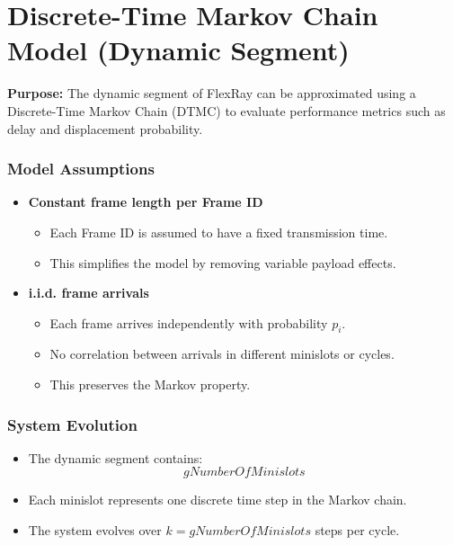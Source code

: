 \section*{Discrete-Time Markov Chain Model (Dynamic Segment)}

\textbf{Purpose:}
The dynamic segment of FlexRay can be approximated using a Discrete-Time Markov Chain (DTMC) to evaluate performance metrics such as delay and displacement probability.

\subsubsection*{Model Assumptions}

\begin{itemize}
    \item \textbf{Constant frame length per Frame ID}
    \begin{itemize}
        \item Each Frame ID is assumed to have a fixed transmission time.
        \item This simplifies the model by removing variable payload effects.
    \end{itemize}
    
    \item \textbf{i.i.d. frame arrivals}
    \begin{itemize}
        \item Each frame arrives independently with probability $p_i$.
        \item No correlation between arrivals in different minislots or cycles.
        \item This preserves the Markov property.
    \end{itemize}
\end{itemize}

\subsubsection*{System Evolution}

\begin{itemize}
    \item The dynamic segment contains:
    \[
    gNumberOfMinislots
    \]
    
    \item Each minislot represents one discrete time step in the Markov chain.
    
    \item The system evolves over $k = gNumberOfMinislots$ steps per cycle.
\end{itemize}

